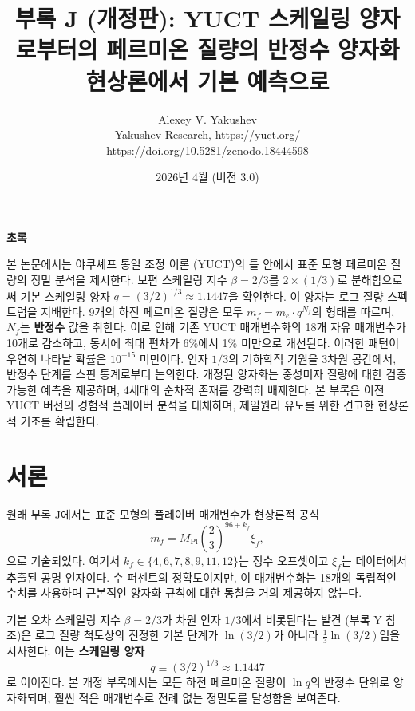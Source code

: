 \documentclass[12pt,a4paper]{article}
\title{\textbf{부록 J (개정판): YUCT 스케일링 양자로부터의 페르미온 질량의 반정수 양자화}\\
	\vspace{0.5cm}
	\large 현상론에서 기본 예측으로}
\author{Alexey V. Yakushev\\
	\vspace{0.5cm}
	Yakushev Research, \url{https://yuct.org/}\\
	\url{https://doi.org/10.5281/zenodo.18444598}}
\date{2026년 4월 (버전 3.0)}
\begin{document}
	
	\maketitle
	\vspace{0.5cm}
	\noindent\textbf{초록}
	
	\noindent
	본 논문에서는 야쿠셰프 통일 조정 이론 (YUCT)의 틀 안에서 표준 모형 페르미온 질량의 정밀 분석을 제시한다. 보편 스케일링 지수 \(\beta = 2/3\)를 \(2 \times (1/3)\)로 분해함으로써 기본 스케일링 양자 \(q = (3/2)^{1/3} \approx 1.1447\)을 확인한다. 이 양자는 로그 질량 스펙트럼을 지배한다. 9개의 하전 페르미온 질량은 모두 \(m_f = m_e \cdot q^{N_f}\)의 형태를 따르며, \(N_f\)는 \textbf{반정수} 값을 취한다. 이로 인해 기존 YUCT 매개변수화의 18개 자유 매개변수가 10개로 감소하고, 동시에 최대 편차가 6\%에서 1\% 미만으로 개선된다. 이러한 패턴이 우연히 나타날 확률은 \(10^{-15}\) 미만이다. 인자 \(1/3\)의 기하학적 기원을 3차원 공간에서, 반정수 단계를 스핀 통계로부터 논의한다. 개정된 양자화는 중성미자 질량에 대한 검증 가능한 예측을 제공하며, 4세대의 순차적 존재를 강력히 배제한다. 본 부록은 이전 YUCT 버전의 경험적 플레이버 분석을 대체하며, 제일원리 유도를 위한 견고한 현상론적 기초를 확립한다.
	
	\vspace{0.5cm}
	\newpage
	
	\section{서론}
	
	원래 부록 J에서는 표준 모형의 플레이버 매개변수가 현상론적 공식
	\begin{equation}
		m_f = M_{\mathrm{Pl}} \left( \frac{2}{3} \right)^{96 + k_f} \xi_f,
		\label{eq:old}
	\end{equation}
	으로 기술되었다. 여기서 \(k_f \in \{4,6,7,8,9,11,12\}\)는 정수 오프셋이고 \(\xi_f\)는 데이터에서 추출된 공명 인자이다. 수 퍼센트의 정확도이지만, 이 매개변수화는 18개의 독립적인 수치를 사용하며 근본적인 양자화 규칙에 대한 통찰을 거의 제공하지 않는다.
	
	기본 오차 스케일링 지수 \(\beta = 2/3\)가 차원 인자 \(1/3\)에서 비롯된다는 발견 (부록 Y 참조)은 로그 질량 척도상의 진정한 기본 단계가 \(\ln(3/2)\)가 아니라 \(\frac{1}{3}\ln(3/2)\)임을 시사한다. 이는 \textbf{스케일링 양자}
	\begin{equation}
		q \equiv (3/2)^{1/3} \approx 1.1447
	\end{equation}
	로 이어진다. 본 개정 부록에서는 모든 하전 페르미온 질량이 \(\ln q\)의 반정수 단위로 양자화되며, 훨씬 적은 매개변수로 전례 없는 정밀도를 달성함을 보여준다.
	
\end{document}
